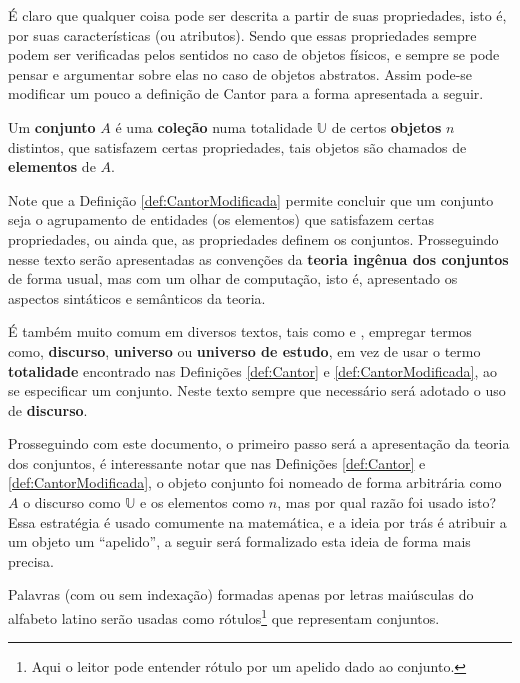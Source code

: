 É claro que qualquer coisa pode ser descrita a partir de suas propriedades, isto é, por suas características (ou atributos). Sendo que essas propriedades sempre podem ser verificadas pelos sentidos no caso de objetos físicos, e sempre se pode pensar e argumentar sobre elas no caso de objetos abstratos. Assim pode-se modificar um pouco a definição de Cantor para a forma apresentada a seguir.

\begin{definicao}\label{def:CantorModificada}
  Um \textbf{conjunto} $A$ é uma \textbf{coleção} numa totalidade $\mathbb{U}$ de certos \textbf{objetos} $n$ distintos, que satisfazem certas propriedades, tais objetos são chamados de \textbf{elementos} de $A$.
\end{definicao}

Note que a Definição \ref{def:CantorModificada} permite concluir que um conjunto seja o agrupamento de entidades (os elementos) que satisfazem certas propriedades, ou ainda que, as propriedades definem os conjuntos. Prosseguindo nesse texto serão apresentadas as convenções da \textbf{teoria ingênua dos conjuntos} de forma usual, mas com um olhar de computação, isto é, apresentado os aspectos sintáticos e semânticos da teoria. 

\begin{nota}[Nomenclatura.]\label{note:NomeclaturaDiscurso}
  É também muito comum em diversos textos, tais como \cite{carmo2013} e \cite{lipschutz1978-TC}, empregar termos como, {\bf discurso}, {\bf universo} ou {\bf universo de estudo}, em vez de usar o termo {\bf totalidade} encontrado nas Definições \ref{def:Cantor} e \ref{def:CantorModificada}, ao se especificar um conjunto. Neste texto sempre que necessário será adotado o uso de {\bf discurso}.
\end{nota}

Prosseguindo com este documento, o primeiro passo será a apresentação da teoria dos conjuntos, é interessante notar que nas Definições \ref{def:Cantor} e \ref{def:CantorModificada}, o objeto conjunto foi nomeado de forma arbitrária como $A$ o discurso como $\mathbb{U}$ e os elementos como $n$, mas por qual razão foi usado isto? Essa estratégia é usado comumente na matemática, e a ideia por trás é atribuir a um objeto um ``apelido'', a seguir será formalizado esta ideia de forma mais precisa.

\begin{definicao}\label{def:RotuloConjunto}
	Palavras (com ou sem indexação) formadas apenas por letras maiúsculas do alfabeto latino serão usadas como rótulos\footnote{Aqui o leitor pode entender rótulo por um apelido dado ao conjunto.} que representam conjuntos.
\end{definicao}

